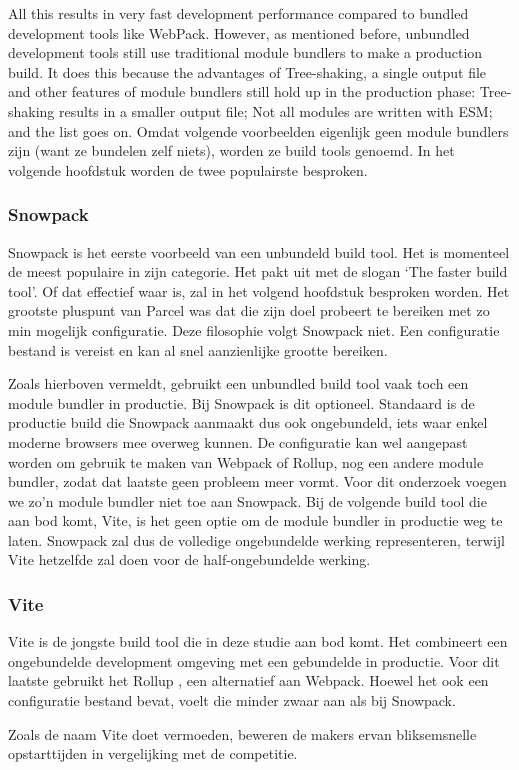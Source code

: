 All this results in very fast development performance compared to bundled development tools like WebPack. However, as mentioned before, unbundled development tools still use traditional module bundlers to make a production build. It does this because the advantages of Tree-shaking, a single output file and other features of module bundlers still hold up in the production phase: Tree-shaking results in a smaller output file; Not all modules are written with ESM; and the list goes on. Omdat volgende voorbeelden eigenlijk geen module bundlers zijn (want ze bundelen zelf niets), worden ze build tools genoemd. In het volgende hoofdstuk worden de twee populairste besproken.

\subsubsection{Snowpack}

Snowpack is het eerste voorbeeld van een unbundeld build tool. Het is momenteel de meest populaire in zijn categorie. Het pakt uit met de slogan ‘The faster build tool’. Of dat effectief waar is, zal in het volgend hoofdstuk besproken worden. Het grootste pluspunt van Parcel was dat die zijn doel probeert te bereiken met zo min mogelijk configuratie. Deze filosophie volgt Snowpack niet. Een configuratie bestand is vereist en kan al snel aanzienlijke grootte bereiken. 

Zoals hierboven vermeldt, gebruikt een unbundled build tool vaak toch een module bundler in productie. Bij Snowpack is dit optioneel. Standaard is de productie build die Snowpack aanmaakt dus ook ongebundeld, iets waar enkel moderne browsers mee overweg kunnen. De configuratie kan wel aangepast worden om gebruik te maken van Webpack of Rollup, nog een andere module bundler, zodat dat laatste geen probleem meer vormt. Voor dit onderzoek voegen we zo’n module bundler niet toe aan Snowpack. Bij de volgende build tool die aan bod komt, Vite, is het geen optie om de module bundler in productie weg te laten. Snowpack zal dus de volledige ongebundelde werking representeren, terwijl Vite hetzelfde zal doen voor de half-ongebundelde werking.

\subsubsection{Vite}
Vite is de jongste build tool die in deze studie aan bod komt. Het combineert een ongebundelde development omgeving met een gebundelde in productie. Voor dit laatste gebruikt het Rollup \autocite{vite-no-date}, een alternatief aan Webpack. Hoewel het ook een configuratie bestand bevat, voelt die minder zwaar aan als bij Snowpack. 

Zoals de naam Vite doet vermoeden, beweren de makers ervan bliksemsnelle opstarttijden in vergelijking met de competitie. 

